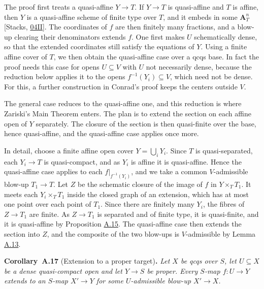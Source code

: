 \documentclass[11pt]{article}
\newenvironment{bpstatement}[2]{\par\addvspace{0.6\baselineskip}\noindent\textbf{#1}#2\textbf{.}\enspace\ignorespaces}
  {\par\addvspace{0.4\baselineskip}}
\newenvironment{bpstatementit}[2]{\begin{bpstatement}{#1}{#2}\itshape\ignorespaces}{\end{bpstatement}}
\begin{document}
The proof first treats a quasi-affine \(Y\to T\). If \(Y\to T\) is quasi-affine and \(T\) is affine, then \(Y\) is a quasi-affine scheme of finite type over \(T\), and it embeds in some \(\mathbf A^n_T\) [Stacks, \href{https://stacks.math.columbia.edu/tag/04II}{04II}]. The coordinates of \(f\) are then finitely many fractions, and a blow-up clearing their denominators extends \(f\). One first makes \(U\) schematically dense, so that the extended coordinates still satisfy the equations of \(Y\). Using a finite affine cover of \(T\), we then obtain the quasi-affine case over a qcqs base. In fact the proof needs this case for opens \(U\subseteq V\) with \(U\) not necessarily dense, because the reduction below applies it to the opens \(f^{-1}(Y_i)\subseteq V\), which need not be dense. For this, a further construction in Conrad's proof keeps the centers outside \(V\).

The general case reduces to the quasi-affine one, and this reduction is where Zariski's Main Theorem enters. The plan is to extend the section on each affine open of \(Y\) separately. The closure of the section is then quasi-finite over the base, hence quasi-affine, and the quasi-affine case applies once more.

In detail, choose a finite affine open cover \(Y=\bigcup_iY_i\). Since \(T\) is quasi-separated, each \(Y_i\to T\) is quasi-compact, and as \(Y_i\) is affine it is quasi-affine. Hence the quasi-affine case applies to each \(f|_{f^{-1}(Y_i)}\), and we take a common \(V\)-admissible blow-up \(T_1\to T\). Let \(Z\) be the schematic closure of the image of \(f\) in \(Y\times_TT_1\). It meets each \(Y_i\times_TT_1\) inside the closed graph of an extension, which has at most one point over each point of \(T_1\). Since there are finitely many \(Y_i\), the fibres of \(Z\to T_1\) are finite. As \(Z\to T_1\) is separated and of finite type, it is quasi-finite, and it is quasi-affine by Proposition \hyperref[bp40]{A.15}. The quasi-affine case then extends the section into \(Z\), and the composite of the two blow-ups is \(V\)-admissible by Lemma \hyperref[bp35]{A.13}.

\label{bp45}%
\begin{bpstatementit}{Corollary~A.17}{ (Extension to a proper target)}
Let \(X\) be qcqs over \(S\), let \(U\subseteq X\) be a dense quasi-compact open and let \(Y\to S\) be proper. Every \(S\)-map \(f:U\to Y\) extends to an \(S\)-map \(X'\to Y\) for some \(U\)-admissible blow-up \(X'\to X\).
\end{bpstatementit}
\end{document}
